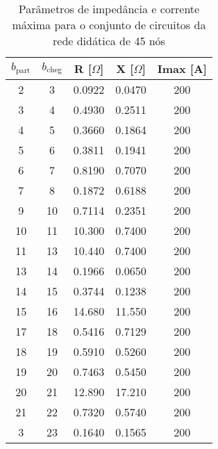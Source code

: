 \begin{table}[H]
    \label{tab:impedancia}
    \caption{Parâmetros de impedância e corrente máxima para o conjunto de circuitos da rede didática de 45 nós}
    \begin{minipage}{.5\linewidth}
        \centering
        \begin{tabular}{|c|c|c|c|c|}
        \hline
        $b_\text{part}$ & $b_\text{cheg}$& R [$\Omega$]  & X [$\Omega$] & Imax [A]\\ \hline
         2 &  3 & 0.0922 & 0.0470 & 200\\ \hline
         3 &  4 & 0.4930 & 0.2511 & 200\\ \hline
         4 &  5 & 0.3660 & 0.1864 & 200\\ \hline
         5 &  6 & 0.3811 & 0.1941 & 200\\ \hline
         6 &  7 & 0.8190 & 0.7070 & 200\\ \hline
         7 &  8 & 0.1872 & 0.6188 & 200\\ \hline
         9 & 10 & 0.7114 & 0.2351 & 200\\ \hline
        10 & 11 & 10.300 & 0.7400 & 200\\ \hline
        11 & 13 & 10.440 & 0.7400 & 200\\ \hline
        13 & 14 & 0.1966 & 0.0650 & 200\\ \hline
        14 & 15 & 0.3744 & 0.1238 & 200\\ \hline
        15 & 16 & 14.680 & 11.550 & 200\\ \hline
        17 & 18 & 0.5416 & 0.7129 & 200\\ \hline
        18 & 19 & 0.5910 & 0.5260 & 200\\ \hline
        19 & 20 & 0.7463 & 0.5450 & 200\\ \hline
        20 & 21 & 12.890 & 17.210 & 200\\ \hline
        21 & 22 & 0.7320 & 0.5740 & 200\\ \hline
         3 & 23 & 0.1640 & 0.1565 & 200\\ \hline        
        \end{tabular}
        

\end{minipage}
\end{table}
